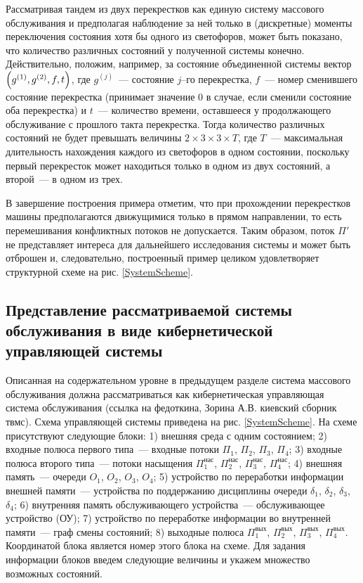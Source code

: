 \documentclass[a4paper,12pt,russian]{extarticle}
\begin{document}
Рассматривая тандем из двух перекрестков как единую систему массового обслуживания и предполагая наблюдение за ней только в (дискретные) моменты переключения состояния хотя бы одного из светофоров, может быть показано, что количество различных состояний у полученной системы конечно. Действительно, положим, например, за состояние объединенной системы вектор $\left(g^{(1)},g^{(2)}, f, t\right)$, где $g^{(j)}$~--- состояние $j$--го перекрестка, $f$~--- номер сменившего состояние перекрестка (принимает значение $0$ в случае, если сменили состояние оба перекрестка) и $t$~--- количество времени, оставшееся у продолжающего обслуживание с прошлого такта перекрестка. Тогда количество различных состояний не будет превышать величины  $2\times 3 \times 3 \times T$, где $T$~--- максимальная длительность нахождения каждого из светофоров в одном состоянии, поскольку первый перекресток может находиться только в одном из двух состояний, а второй~--- в одном из трех.

В завершение построения примера отметим, что при прохождении перекрестков машины предполагаются движущимися только в прямом направлении, то есть перемешивания конфликтных потоков не допускается. Таким образом, поток $\Pi'$ не представляет интереса для дальнейшего исследования системы и может быть отброшен и, следовательно, построенный пример целиком удовлетворяет структурной схеме на рис. \ref{SystemScheme}.
 
\subsection{Представление рассматриваемой системы обслуживания в виде кибернетической управляющей системы}
Описанная на содержательном уровне в предыдущем разделе система массового обслуживания должна рассматриваться как кибернетическая управляющая система обслуживания (ссылка на федоткина, Зорина А.В. киевский сборник твмс). Схема управляющей системы приведена на рис. \ref{SystemScheme}. На схеме присутствуют следующие блоки: 1) внешняя среда с одним состоянием; 2) входные полюса первого типа~--- входные потоки $\Pi_1$, $\Pi_2$, $\Pi_3$, $\Pi_4$; 3) входные полюса второго типа~--- потоки насыщения $\Pi_1^{\mathrm{\text{нас}}}$, $\Pi_2^{\mathrm{\text{нас}}}$, $\Pi_3^{\mathrm{\text{нас}}}$, $\Pi_4^{\mathrm{\text{нас}}}$; 4) внешняя память~--- очереди $O_1$, $O_2$, $O_3$, $O_4$; 5) устройство по переработки информации внешней памяти~--- устройства по поддержанию дисциплины очереди $\delta_1$, $\delta_2$, $\delta_3$, $\delta_4$; 6) внутренняя память обслуживающего устройства~--- обслуживающее устройство (ОУ); 7) устройство по переработке информации во внутренней памяти~--- граф смены состояний; 8) выходные полюса $\Pi_1^{\mathrm{\text{вых}}}$, $\Pi_2^{\mathrm{\text{вых}}}$, $\Pi_3^{\mathrm{\text{вых}}}$, $\Pi_4^{\mathrm{\text{вых}}}$. Координатой блока является номер этого блока на схеме. Для задания информации блоков введем следующие величины и укажем множество возможных состояний.
\end{document}
